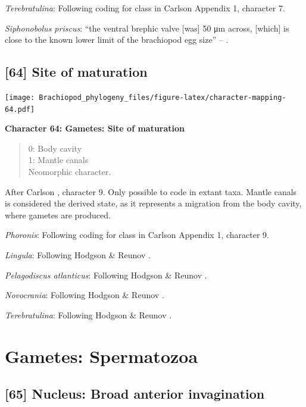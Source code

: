 \documentclass[]{book}
\theoremstyle{definition}
\theoremstyle{definition}
\theoremstyle{definition}
\theoremstyle{remark}
\begin{document}
\emph{Terebratulina}: Following coding for class in Carlson
\citeyearpar{Carlson1995Phylogeneticrelationships} Appendix 1, character
7.

\emph{Siphonobolus priscus}: ``the ventral brephic valve {[}was{]} 50 μm
across, {[}which{]} is close to the known lower limit of the brachiopod
egg size'' -- \citet{Popov2009Earlyontogeny}.

\hypertarget{site-of-maturation}{%
\subsection*{{[}64{]} Site of maturation}\label{site-of-maturation}}

\texttt{[image: Brachiopod\_phylogeny\_files/figure-latex/character-mapping-64.pdf]}

\textbf{Character 64: Gametes: Site of maturation}

\begin{quote}
0: Body cavity\\
1: Mantle canals\\
Neomorphic character.
\end{quote}

After Carlson \citeyearpar{Carlson1995Phylogeneticrelationships},
character 9. Only possible to code in extant taxa. Mantle canals is
considered the derived state, as it represents a migration from the body
cavity, where gametes are produced.

\emph{Phoronis}: Following coding for class in Carlson
\citeyearpar{Carlson1995Phylogeneticrelationships} Appendix 1, character
9.

\emph{Lingula}: Following Hodgson \& Reunov
\citeyearpar{Hodgson1994Ultrastructureof}.

\emph{Pelagodiscus atlanticus}: Following Hodgson \& Reunov
\citeyearpar{Hodgson1994Ultrastructureof}.

\emph{Novocrania}: Following Hodgson \& Reunov
\citeyearpar{Hodgson1994Ultrastructureof}.

\emph{Terebratulina}: Following Hodgson \& Reunov
\citeyearpar{Hodgson1994Ultrastructureof}.

\hypertarget{gametes-spermatozoa}{%
\section{Gametes: Spermatozoa}\label{gametes-spermatozoa}}

\hypertarget{nucleus-broad-anterior-invagination}{%
\subsection*{{[}65{]} Nucleus: Broad anterior
invagination}\label{nucleus-broad-anterior-invagination}}
\end{document}
